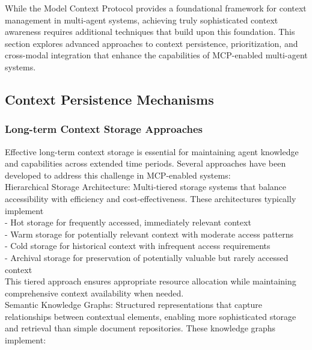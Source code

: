 While the Model Context Protocol provides a foundational framework for context management in multi-agent systems, achieving truly sophisticated context awareness requires additional techniques that build upon this foundation. This section explores advanced approaches to context persistence, prioritization, and cross-modal integration that enhance the capabilities of MCP-enabled multi-agent systems.\\
\subsection{Context Persistence Mechanisms}
\subsubsection{Long-term Context Storage Approaches}
Effective long-term context storage is essential for maintaining agent knowledge and capabilities across extended time periods. Several approaches have been developed to address this challenge in MCP-enabled systems:\\ \newline
Hierarchical Storage Architecture: Multi-tiered storage systems that balance accessibility with efficiency and cost-effectiveness. These architectures typically implement\\ \newline
- Hot storage for frequently accessed, immediately relevant context\\ \newline
- Warm storage for potentially relevant context with moderate access patterns\\ \newline
- Cold storage for historical context with infrequent access requirements\\ \newline
- Archival storage for preservation of potentially valuable but rarely accessed context\\ \newline
This tiered approach ensures appropriate resource allocation while maintaining comprehensive context availability when needed.\\ \newline
Semantic Knowledge Graphs: Structured representations that capture relationships between contextual elements, enabling more sophisticated storage and retrieval than simple document repositories. These knowledge graphs implement:\\ \newline
